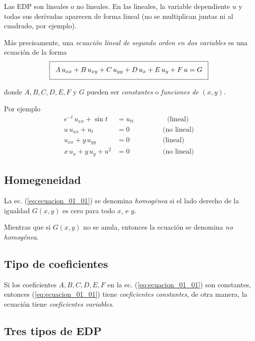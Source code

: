 Las EDP son lineales o no lineales. En las lineales, la variable dependiente $u$ y todas sus derivadas aparecen de forma lineal (no se multiplican juntas ni al cuadrado, por ejemplo).
\par
Más precisamente, una \emph{ecuación lineal de segundo orden en dos variables} es una ecuación de la forma
\begin{align}
\addtolength{\fboxsep}{5pt}\boxed{ A \, u_{xx} + B \, u_{xy} + C \, u_{yy} + D \, u_{x} + E \, u_{y} + F \, u = G}
\label{eq:ecuacion_01_01}
\end{align}

donde $A, B, C, D, E, F$ y $G$ pueden ser \emph{constantes} o \emph{funciones de} $(x, y)$.

Por ejemplo
\begin{align*}
e^{-t} \, u_{xx} + \sin t &= u_{tt} \hspace{2cm} \mbox{(lineal)} \\[0.5em] 
u \, u_{xx} + u_{t} &= 0 \hspace{2cm} \mbox{(no lineal)} \\[0.5em] 
u_{xx} + y \, u_{yy} &= 0 \hspace{2cm} \mbox{(lineal)} \\[0.5em] 
x \, u_{x} + y \, u_{y} + u^{2} &= 0 \hspace{2cm} \mbox{(no lineal)}
\end{align*}

\subsection*{Homegeneidad}

La ec. (\ref{eq:ecuacion_01_01}) se denomina \emph{homogénea} si el lado derecho de la igualdad $G(x, y)$ es cero para todo $x$, e $y$.
\par
Mientras que si $G(x, y)$ no se anula, entonces la ecuación se denomina \emph{no homogénea}.

\subsection*{Tipo de coeficientes}

Si los coeficientes $A, B, C, D, E, F$ en la ec. (\ref{eq:ecuacion_01_01}) son constantes, entonces (\ref{eq:ecuacion_01_01}) tiene \emph{coeficientes constantes}, de otra manera, la ecuación tiene \emph{coeficientes variables}.

\subsection{Tres tipos de EDP}

